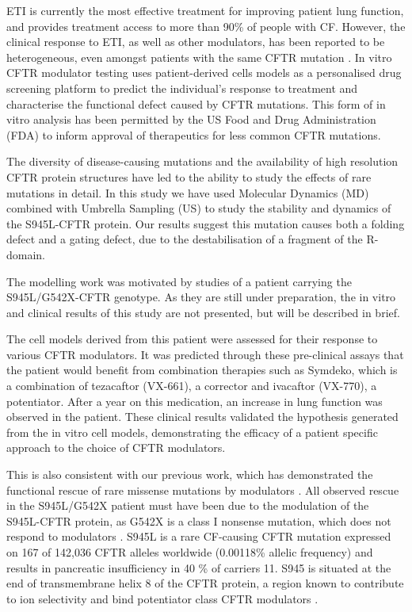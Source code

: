 ETI is currently the most effective treatment for improving patient lung function, \cite{rowe2017,keating2018} and provides treatment access to more than 90\% of people with CF. However, the clinical response to ETI, as well as other modulators, has been reported to be heterogeneous, even amongst patients with the same CFTR mutation \cite{wainwright2015, boyle2014}. In vitro CFTR modulator testing uses patient-derived cells models as a personalised drug screening platform to predict the individual’s response to treatment and characterise the functional defect caused by CFTR mutations. This form of in vitro analysis has been permitted by the US Food and Drug Administration (FDA) to inform approval of therapeutics for less common CFTR mutations. 

The diversity of disease-causing mutations and the availability of high resolution CFTR protein structures have led to the ability to study the effects of rare mutations in detail. In this study we have used Molecular Dynamics (MD) combined with Umbrella Sampling (US) to study the stability and dynamics of the S945L-CFTR protein. Our results suggest this mutation causes both a folding defect and a gating defect, due to the destabilisation of a fragment of the R-domain. 

The modelling work was motivated by studies of a patient carrying the S945L/G542X-CFTR genotype. As they are still under preparation, the in vitro and clinical results of this study are not presented, but will be described in brief.

The cell models derived from this patient were assessed for their response to various CFTR modulators. It was predicted through these pre-clinical assays that the patient would benefit from combination therapies such as Symdeko, which is a combination of tezacaftor (VX-661), a corrector and ivacaftor (VX-770), a potentiator. After a year on this medication, an increase in lung function was observed in the patient. These clinical results validated the hypothesis generated from the in vitro cell models, demonstrating the efficacy of a patient specific approach to the choice of CFTR modulators.

This is also consistent with our previous work, which has demonstrated the functional rescue of rare missense mutations by modulators . All observed rescue in the S945L/G542X patient must have been due to the modulation of the S945L-CFTR protein, as G542X is a class I nonsense mutation, which does not respond to modulators  \cite{hamosh1992, valley2019}. S945L is a rare CF-causing CFTR mutation expressed on 167 of 142,036 CFTR alleles worldwide (0.00118\% allelic frequency) and results in pancreatic insufficiency in 40 \% of carriers 11. S945 is situated at the end of transmembrane helix 8 of the CFTR protein, a region known to contribute to ion selectivity \cite{negoda2019} and bind potentiator class CFTR modulators \cite{liu2019}. 

